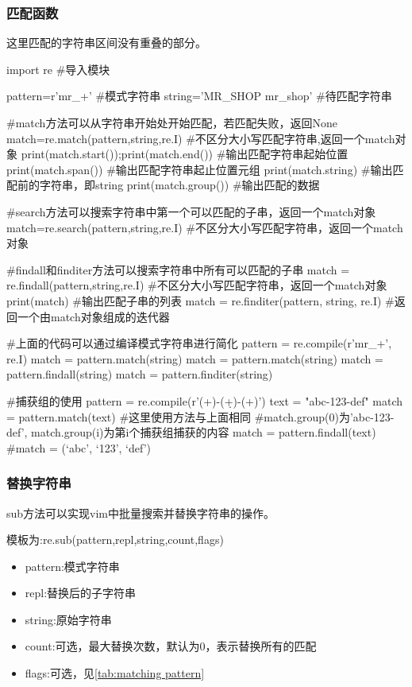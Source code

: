     \subsubsection{匹配函数}
      这里匹配的字符串区间没有重叠的部分。
      \begin{codeblock}[language=python, caption={string matching}]
        import re #导入模块

        pattern=r'mr_\w+' #模式字符串
        string='MR_SHOP mr_shop' #待匹配字符串

        #match方法可以从字符串开始处开始匹配，若匹配失败，返回None
        match=re.match(pattern,string,re.I) #不区分大小写匹配字符串,返回一个match对象
        print(match.start());print(match.end()) #输出匹配字符串起始位置
        print(match.span()) #输出匹配字符串起止位置元组
        print(match.string) #输出匹配前的字符串，即string
        print(match.group()) #输出匹配的数据

        #search方法可以搜索字符串中第一个可以匹配的子串，返回一个match对象
        match=re.search(pattern,string,re.I) #不区分大小写匹配字符串，返回一个match对象

        #findall和finditer方法可以搜索字符串中所有可以匹配的子串
        match = re.findall(pattern,string,re.I) #不区分大小写匹配字符串，返回一个match对象
        print(match) #输出匹配子串的列表
        match = re.finditer(pattern, string, re.I) #返回一个由match对象组成的迭代器

        #上面的代码可以通过编译模式字符串进行简化
        pattern = re.compile(r'mr_\w+', re.I)
        match = pattern.match(string)
        match = pattern.match(string)
        match = pattern.findall(string)
        match = pattern.finditer(string)

        #捕获组的使用
        pattern = re.compile(r'(\w+)-(\d+)-(\w+)')
        text = "abc-123-def"
        match = pattern.match(text) #这里使用方法与上面相同
        #match.group(0)为'abc-123-def', match.group(i)为第i个捕获组捕获的内容
        match = pattern.findall(text) #match = \lbrack(`abc', `123', `def')\rbrack
      \end{codeblock}

    \subsubsection{替换字符串}
      sub方法可以实现vim中批量搜索并替换字符串的操作。

      模板为:re.sub(pattern,repl,string,count,flags)
      \begin{itemize}
        \item pattern:模式字符串
        \item repl:替换后的子字符串
        \item string:原始字符串
        \item count:可选，最大替换次数，默认为0，表示替换所有的匹配
        \item flags:可选，见\autoref{tab:matching pattern}
      \end{itemize}


